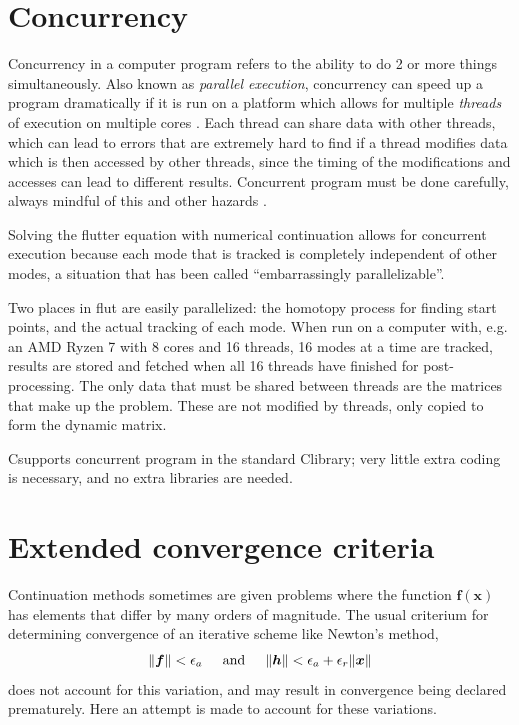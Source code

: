 \documentclass[10pt,openany,twoside]{book}
\numberwithin{equation}{section}   %
\def\Cpp{{C\nolinebreak[4]\hspace{-.05em}\raisebox{.4ex}{\tiny\bf ++}}\:}
\newcommand{\Cmd}[1]{{\sf #1}}
\newcommand{\Newterm}[1]{{\em #1}}
\newcommand{\Vector}[1]{\boldsymbol{#1}}
\begin{document}
\newpage
\section{Concurrency}\label{sect:concurrency}
Concurrency in a computer program refers to the ability to do 2 or
more things simultaneously. Also known as \Newterm{parallel execution},
concurrency can speed up a program dramatically if it is run on a platform
which allows for multiple \Newterm{threads} of execution on multiple cores
\cite{williams2009c++}.
Each thread can share data with other threads, which can lead to errors that
are extremely hard to find if a thread modifies data which is then accessed by
other threads, since the timing of the modifications and accesses can lead
to different results. Concurrent program must be done carefully, always mindful
of this and other hazards
\cite{williams2009c++}.
\par
Solving the flutter equation with numerical continuation allows for
concurrent execution because each mode that is tracked is completely
independent of other modes, a situation that has been called
``embarrassingly parallelizable''.
\par
Two places in \Cmd{flut} are easily parallelized:
the homotopy process for
finding start points, and the actual tracking of each mode. When run on a
computer with, e.g. an AMD Ryzen 7 with 8 cores and 16 threads, 16 modes
at a time are tracked, results are stored and fetched when all 16 threads have
finished for post-processing.
The only data that must be shared between threads are the matrices that
make up the problem. These are not modified by threads, only copied to form
the dynamic matrix.
\par
\Cpp supports concurrent program in the standard \Cpp library; very little extra
coding is necessary, and no extra libraries are needed.

\section{Extended convergence criteria}\label{sect:ecc}
Continuation methods sometimes are given problems where the function
$\Vector{f(x)}$
has elements that differ by many orders of magnitude. The usual criterium
for determining convergence of an iterative scheme like Newton's method,
\begin{equation}
\label{eqn:tradcc}
\| \Vector{f} \| < \epsilon_{a} \hspace{0.2in} \text{and} \hspace{0.2in} \| \Vector{h} \| < \epsilon_{a} + \epsilon_{r}\| \Vector{x} \|
\end{equation}
does not account for this variation, and may result in convergence being
declared prematurely. Here an attempt is made to account for these variations.
\end{document}
